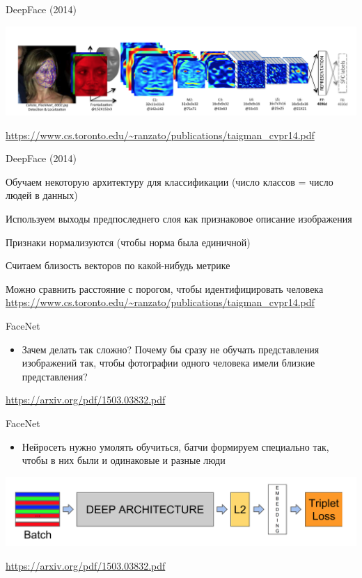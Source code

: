 \documentclass[notes,12pt, aspectratio=169]{beamer}
\newenvironment{wideitemize}{\itemize\addtolength{\itemsep}{10pt}}{\enditemize}
\begin{document}
\begin{frame}{DeepFace (2014)}
\begin{center}
	\includegraphics[width=.95\linewidth]{deepface.png}
\end{center}
\vfill
\footnotesize
{\color{blue} \url{https://www.cs.toronto.edu/~ranzato/publications/taigman_cvpr14.pdf}} 
\end{frame}


\begin{frame}{DeepFace (2014)}
\begin{wideitemize}
	\item Обучаем некоторую архитектуру для классификации (число
	классов = число людей в данных)
	\item Используем выходы предпоследнего слоя как признаковое
	описание изображения
	\item Признаки нормализуются (чтобы норма была единичной)
	\item Считаем близость векторов по какой-нибудь метрике
	\item Можно сравнить расстояние с порогом, чтобы идентифицировать
	человека
\end{wideitemize}
\vfill
\footnotesize
{\color{blue} \url{https://www.cs.toronto.edu/~ranzato/publications/taigman_cvpr14.pdf}} 
\end{frame}


\begin{frame}{FaceNet}
\begin{itemize}
	\item Зачем делать так сложно? Почему бы сразу не обучать
	представления изображений так, чтобы фотографии одного человека имели близкие представления?
\end{itemize}
\vfill
\footnotesize
{\color{blue} \url{https://arxiv.org/pdf/1503.03832.pdf}} 
\end{frame}


\begin{frame}{FaceNet}
\begin{itemize}
	\item Нейросеть нужно \alert{умолять обучиться,} батчи  формируем специально так, чтобы в них были и одинаковые и разные люди
\end{itemize}
\begin{center}
	\includegraphics[width=.9\linewidth]{facenet_model.png}
\end{center}
\vfill
\footnotesize
{\color{blue} \url{https://arxiv.org/pdf/1503.03832.pdf}} 
\end{frame}
\end{document}
